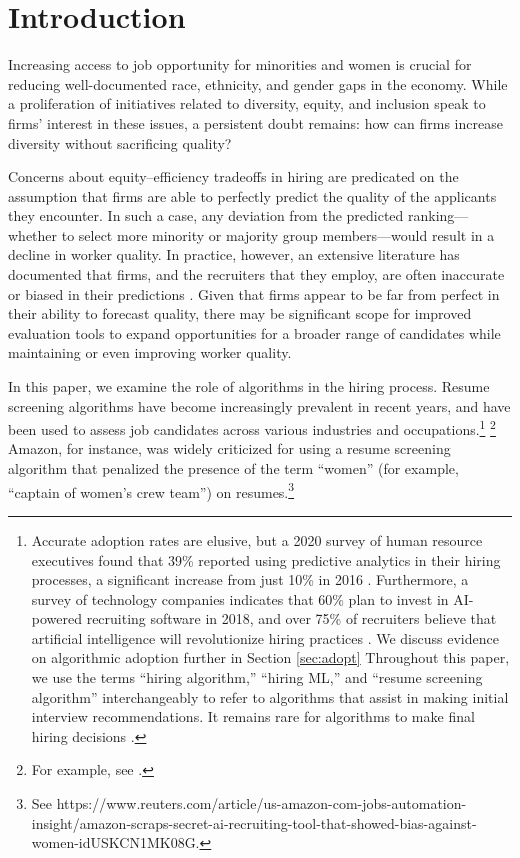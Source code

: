 \documentclass[crop,noquery,editorname,historyrev,nosurname,runningno,sepcount]{RESTUD}
\begin{document}
\vspace*{-2pc}
\section{Introduction}

Increasing access to job opportunity for minorities and women is crucial for reducing well-documented race, ethnicity, and gender gaps in the economy.  While a proliferation of initiatives related to diversity, equity, and inclusion speak to firms' interest in these issues, a persistent doubt remains: how can firms increase diversity without sacrificing quality?  

Concerns about equity--efficiency tradeoffs in hiring are predicated on the assumption that firms are able to perfectly predict the quality of the applicants they encounter.  In such a case, any deviation from the predicted ranking---whether to select more minority or majority group members---would result in a decline in worker quality.  In practice, however, an extensive literature has documented that firms, and the recruiters that they employ, are often inaccurate or biased in their predictions \citep{bensonlishue2021, klinerosewalters}.  Given that firms appear to be far from perfect in their ability to forecast quality, there may be significant scope for improved evaluation tools to expand opportunities for a broader range of candidates while maintaining or even improving worker quality.


In this paper, we examine the role of algorithms in the hiring process. Resume screening algorithms have become increasingly prevalent in recent years, and have been used to assess job candidates across various industries and occupations.\footnote{Accurate adoption rates are elusive, but a 2020 survey of human resource executives found that 39\% reported using predictive analytics in their hiring processes, a significant increase from just 10\% in 2016 \citep{mercer2020}. Furthermore, a survey of technology companies indicates that 60\% plan to invest in AI-powered recruiting software in 2018, and over 75\% of recruiters believe that artificial intelligence will revolutionize hiring practices \citep{bogen2018help}. We discuss evidence on algorithmic adoption further in Section \ref{sec:adopt}
Throughout this paper, we use the terms ``hiring algorithm,'' ``hiring ML,'' and ``resume screening algorithm'' interchangeably to refer to algorithms that assist in making initial interview recommendations. It remains rare for algorithms to make final hiring decisions \citep{raghavan2019}.} \footnote{For example, see \citet{barzilay2019, mckinney2020A, mullainathanobermeyer2019, schrittwieser2019mastering, Russakovsky_2015, ajunwaparadox}.}  Amazon, for instance, was widely criticized for using a resume screening algorithm that penalized the presence of the term ``women'' (for example, ``captain of women's crew team'') on resumes.\footnote{See https://www.reuters.com/article/us-amazon-com-jobs-automation-insight/amazon-scraps-secret-ai-recruiting-tool-that-showed-bias-against-women-idUSKCN1MK08G.} 
\end{document}
